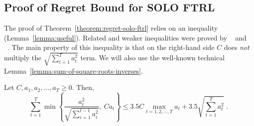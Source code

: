 \subsection{Proof of Regret Bound for \textsc{SOLO FTRL}}
\label{section:solo-ftrl-regret-bound}

The proof of Theorem~\ref{theorem:regret-solo-ftrl} relies on an inequality
(Lemma~\ref{lemma:useful}).  Related and weaker inequalities were proved by
~\cite{Auer-Cesa-Bianchi-Gentile-2002} and ~\cite{Jaksch-Ortner-Auer-2010}.
The main property of this inequality is that on the right-hand side $C$ does
\emph{not} multiply the $\sqrt{\sum_{t=1}^T a_t^2}$ term.  We will also use the
well-known technical Lemma~\ref{lemma:sum-of-square-roots-inverses}.

\begin{lemma}
\label{lemma:useful}
Let $C, a_1, a_2, \dots, a_T \ge 0$. Then,
$$
\sum_{t=1}^T \min \left\{ \frac{a_t^2}{\sqrt{\sum_{i=1}^{t-1} a_i^2}}, \ C a_t \right\}
\le 3.5 C \max_{t=1,2,\dots,T} a_t + 3.5 \sqrt{\sum_{t=1}^T a_t^2} \; .
$$
\end{lemma}
